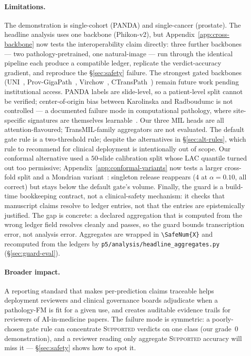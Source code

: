 \documentclass{article}
\newcommand{\SafeNum}[1]{#1}
\begin{document}
\paragraph{Limitations.}
\label{sec:limitations}
The demonstration is single-cohort (PANDA) and single-cancer (prostate). The headline analysis uses one backbone (Phikon-v2), but Appendix~\ref{app:cross-backbone} now tests the interoperability claim directly: three further backbones --- two pathology-pretrained, one natural-image --- run through the identical pipeline each produce a compatible ledger, replicate the verdict-accuracy gradient, and reproduce the \S\ref{sec:safety} failure. The strongest gated backbones (UNI~\citep{chen2024uni}, Prov-GigaPath~\citep{xu2024gigapath}, Virchow~\citep{vorontsov2024virchow}, CTransPath~\citep{wang2022ctranspath}) remain future work pending institutional access. PANDA labels are slide-level, so a patient-level split cannot be verified; center-of-origin bias between Karolinska and Radboudumc is not controlled --- a documented failure mode in computational pathology, where site-specific signatures are themselves learnable~\citep{howard2021site}. Our three MIL heads are all attention-flavoured; TransMIL-family aggregators are not evaluated. The default gate rule is a two-threshold rule; despite the alternatives in \S\ref{sec:alt-rules}, which rule to recommend for clinical deployment is intentionally out of scope. Our conformal alternative used a $\SafeNum{50}$-slide calibration split whose LAC quantile turned out too permissive; Appendix~\ref{app:conformal-variants} now tests a larger cross-fold split and a Mondrian variant~\citep{romano2020classification}: singleton release reappears ($\SafeNum{4}$ at $\alpha{=}\SafeNum{0.10}$, all correct) but stays below the default gate's volume. Finally, the guard is a build-time bookkeeping contract, not a clinical-safety mechanism: it checks that manuscript claims resolve to ledger entries, not that the entries are epistemically justified. The gap is concrete: a declared aggregation that is computed from the wrong ledger field resolves cleanly and passes, so the guard bounds transcription error, not analysis error. Aggregates are wrapped in \texttt{\textbackslash SafeNum\{X\}} and recomputed from the ledgers by \texttt{p5/analysis/headline\_aggregates.py} (\S\ref{sec:guard-eval}).

\paragraph{Broader impact.} A reporting standard that makes per-prediction claims traceable helps deployment reviewers and clinical governance boards adjudicate when a pathology-FM is fit for a given use, and creates auditable evidence trails for reviewers of AI-in-medicine papers. The failure mode is symmetric: a poorly-chosen gate rule can concentrate \textsc{Supported} verdicts on one class (our grade~$\SafeNum{0}$ demonstration), and a reviewer reading only aggregate \textsc{Supported} accuracy will miss it --- \S\ref{sec:safety} shows how to spot it.
\end{document}

